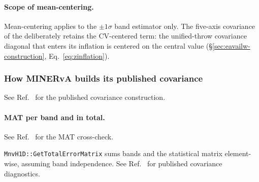 \paragraph{Scope of mean-centering.} Mean-centering applies to the $\pm1\sigma$ band estimator only. The five-axis covariance of the \resFiveAxis{} deliberately retains the CV-centered term: the unified-throw covariance diagonal that enters its inflation is centered on the central value (\S\ref{sec:eavailw-construction}, Eq.~\eqref{eq:zinflation}).

\subsubsection{How MINERvA builds its published covariance}
\label{sec:minerva}
See Ref.~\cite{NoteRecords2026} for the published covariance construction.


\paragraph{MAT per band and in total.} See Ref.~\cite{NoteRecords2026} for the MAT cross-check.

\texttt{MnvH1D::GetTotalErrorMatrix} sums bands and the statistical matrix element-wise, assuming band independence. See Ref.~\cite{NoteRecords2026} for published covariance diagnostics.



